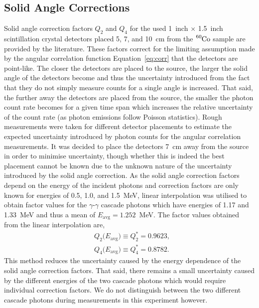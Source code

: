 \documentclass[twocolumn]{article}
\begin{document}
\subsection{Solid Angle Corrections}
Solid angle correction factors $Q_2$ and $Q_4$ for the used 1~inch $\times$ 1.5~inch scintillation crystal detectors placed 5, 7, and 10~cm from the $\ce{^{60}Co}$ sample are provided by the literature.\cite{sieg} These factors correct for the limiting assumption made by the angular correlation function Equation~\ref{eq:corr} that the detectors are point-like. The closer the detectors are placed to the source, the larger the solid angle of the detectors become and thus the uncertainty introduced from the fact that they do not simply measure counts for a single angle is increased. That said, the further away the detectors are placed from the source, the smaller the photon count rate becomes for a given time span which increases the relative uncertainty of the count rate (as photon emissions follow Poisson statistics). Rough measurements were taken for different detector placements to estimate the expected uncertainty introduced by photon counts for the angular correlation measurements. It was decided to place the detectors 7~cm away from the source in order to minimise uncertainty, though whether this is indeed the best placement cannot be known due to the unknown nature of the uncertainty introduced by the solid angle correction. As the solid angle correction factors depend on the energy of the incident photons and correction factors are only known for energies of 0.5, 1.0, and 1.5~MeV, linear interpolation was utilised to obtain factor values for the $\gamma$-$\gamma$ cascade photons which have energies of 1.17 and 1.33~MeV and thus a mean of $E_{\text{avg}} = 1.252$~MeV. The factor values obtained from the linear interpolation are,
\begin{align*}
&Q_2\big(E_{\text{avg}}\big) \equiv Q^*_2 = 0.9623,\\
&Q_4\big(E_{\text{avg}}\big) \equiv Q^*_4 = 0.8782.
\end{align*}
This method reduces the uncertainty caused by the energy dependence of the solid angle correction factors. That said, there remains a small uncertainty caused by the different energies of the two cascade photons which would require individual correction factors. We do not distinguish between the two different cascade photons during measurements in this experiment however.
\end{document}
